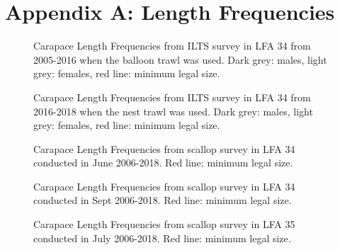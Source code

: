 \documentclass[11pt]{article}
\newcommand{\e}{\string~/bio.data/bio.lobster/figures/LFA3438Framework2019/figures/} %
\begin{document}
\appendix
\renewcommand\thefigure{\thesection.\arabic{figure}}    
\section{Appendix A: Length Frequencies}
\setcounter{figure}{0}    


    \begin{figure}
    \centering
        \caption{Carapace Length Frequencies from ILTS survey in LFA 34 from 2005-2016 when the balloon trawl was used. Dark grey: males, light grey: females, red line: minimum legal size.}

    \end{figure}


    \begin{figure}
    \centering
        \caption{Carapace Length Frequencies from ILTS survey in LFA 34 from 2016-2018 when the nest trawl was used. Dark grey: males, light grey: females, red line: minimum legal size.}

    \end{figure}


   \begin{figure}
   \centering
       \caption{Carapace Length Frequencies from scallop survey in LFA 34 conducted in June 2006-2018. Red line: minimum legal size.}
   \end{figure}
   \begin{figure}
   \centering
       \caption{Carapace Length Frequencies from scallop survey in LFA 34 conducted in Sept 2006-2018. Red line: minimum legal size.}
   \end{figure}



    \begin{figure}
    \centering
        \caption{Carapace Length Frequencies from scallop survey in LFA 35 conducted in July 2006-2018. Red line: minimum legal size.}

    \end{figure}
\end{document}
